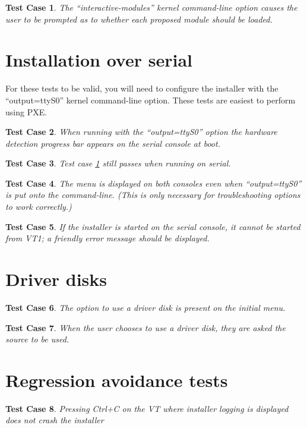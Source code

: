\documentclass[a4paper]{article}
\newtheorem{testcase}{Test Case}
\begin{document}
\begin{testcase} \label{tc:interactive-modules}
The ``interactive-modules'' kernel command-line option causes the user
to be prompted as to whether each proposed module should be loaded.
\end{testcase}

\section{Installation over serial}

For these tests to be valid, you will need to configure the installer
with the ``output=ttyS0'' kernel command-line option.  These tests are
easiest to perform using PXE.

\begin{testcase}
When running with the ``output=ttyS0'' option the hardware detection
progress bar appears on the serial console at boot.
\end{testcase}

\begin{testcase}
Test case \ref{tc:interactive-modules} still passes when running on serial.
\end{testcase}

\begin{testcase}
The menu is displayed on both consoles even when ``output=ttyS0'' is
put onto the command-line.  (This is only necessary for
troubleshooting options to work correctly.)
\end{testcase}

\begin{testcase}
If the installer is started on the serial console, it cannot be
started from VT1; a friendly error message should be displayed.
\end{testcase}

\section{Driver disks}

\begin{testcase}
The option to use a driver disk is present on the initial menu.
\end{testcase}

\begin{testcase}
When the user chooses to use a driver disk, they are asked the source
to be used.
\end{testcase}

\section{Regression avoidance tests}

\begin{testcase}
Pressing Ctrl+C on the VT where installer logging is displayed does
not crash the installer
\end{testcase}
\end{document}
